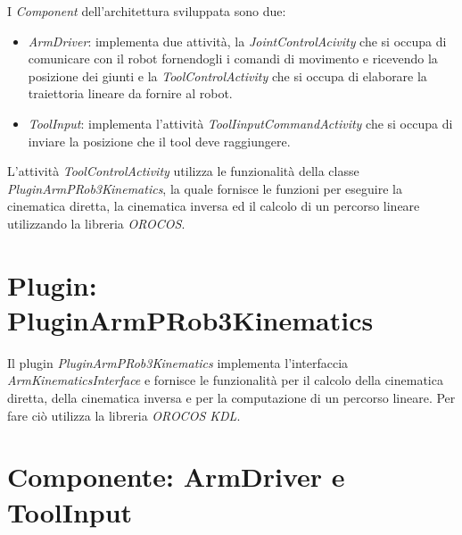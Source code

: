 I \textit{Component} dell'architettura sviluppata sono due:
\begin{itemize}
	\item \textit{ArmDriver}: implementa due attività, la \textit{JointControlAcivity} che si occupa di comunicare con il robot fornendogli i comandi di movimento e ricevendo la posizione dei giunti e la \textit{ToolControlActivity} che si occupa di elaborare la traiettoria lineare da fornire al robot. 
	\item \textit{ToolInput}: implementa l'attività \textit{ToolIinputCommandActivity} che si occupa di inviare la posizione che il tool deve raggiungere.
\end{itemize}
\noindent
L'attività \textit{ToolControlActivity} utilizza le funzionalità della classe \textit{PluginArmPRob3Kinematics}, la quale fornisce le funzioni per eseguire la cinematica diretta, la cinematica inversa ed il calcolo di un percorso lineare utilizzando la libreria \textit{OROCOS}.


\section{Plugin: PluginArmPRob3Kinematics}
Il plugin \textit{PluginArmPRob3Kinematics} implementa l'interfaccia \textit{ArmKinematicsInterface} e fornisce le funzionalità per il calcolo della cinematica diretta, della cinematica inversa e per la computazione di un percorso lineare. Per fare ciò utilizza la libreria \textit{OROCOS KDL}. 
\section{Componente: ArmDriver e ToolInput}
